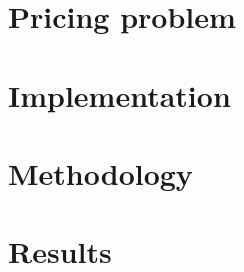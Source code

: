 \section{Pricing problem}\label{sec:boolean-pricing-problem}


\section{Implementation}\label{sec:boolean-implementation}


\section{Methodology}\label{sec:boolean-methodology}


\section{Results}\label{sec:boolean-results}

